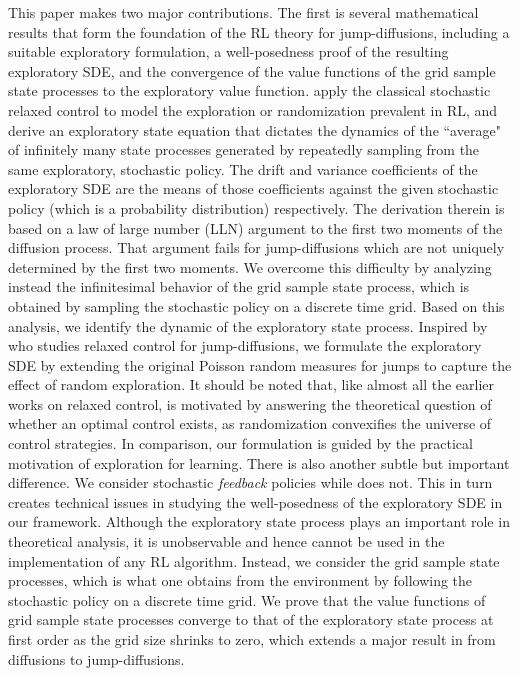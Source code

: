 \documentclass[11pt]{article}
\newcommand{\1}{\mathbbm{1}}
\begin{document}

This paper makes two major contributions. {The first is several mathematical results that form the foundation of the RL theory for jump-diffusions, including a suitable exploratory formulation, a well-posedness proof of the resulting exploratory SDE, and the convergence of the value functions of the grid sample state processes to the exploratory value function.} \cite{wang2020reinforcement} apply the classical stochastic relaxed control to model the exploration or randomization prevalent in RL, and derive an exploratory state equation that dictates the dynamics of the ``average" of infinitely many state processes generated by repeatedly sampling from the same exploratory, stochastic policy. The drift and variance coefficients of the exploratory SDE are the means of those coefficients against the given stochastic policy (which is a probability distribution) respectively. The derivation therein is based on a law of large
number (LLN) argument to the first two moments of the diffusion process. That argument fails for jump-diffusions which are not uniquely determined by the first two moments.
We overcome this difficulty by analyzing instead the infinitesimal behavior of the grid sample state process, which is obtained by sampling the stochastic policy on a discrete time grid. Based on this analysis, we identify the dynamic of the exploratory state process. Inspired by
\cite{kushner2000jump} who studies relaxed control for jump-diffusions, we formulate the exploratory SDE by extending the original Poisson random measures for jumps to capture the effect of random exploration. It should be noted that, like almost all the earlier works on relaxed control,  \cite{kushner2000jump} is motivated by answering  the theoretical question of whether an optimal control exists, as randomization convexifies the universe of control strategies. In comparison, our formulation is guided by the practical motivation of exploration for learning. There is also another subtle but important difference. We consider stochastic \emph{feedback} policies while \cite{kushner2000jump} does not. This in turn creates technical issues in studying the well-posedness of the exploratory SDE in our framework. Although the exploratory state process plays an important role in theoretical analysis, it is unobservable and hence cannot be used in the implementation of any RL algorithm. Instead, we consider the grid sample state processes, which is what one obtains from the environment by following the stochastic policy on a discrete time grid. We prove that the value functions of grid sample state processes converge to that of the exploratory state process at first order as the grid size shrinks to zero, which extends a major result in \cite{jia2025accuracy} from diffusions to jump-diffusions.
\end{document}
